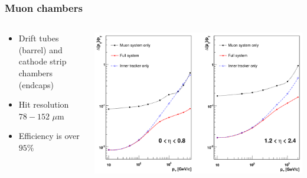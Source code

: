 \documentclass[aspectratio=169,xcolor=dvipsnames,,table,compress]{beamer}
\begin{document}
\begin{frame} \frametitle{Muon chambers}
  \begin{columns}
    \begin{column}{0.6\textwidth}
      \begin{itemize}
        \item Drift tubes (barrel) and cathode strip chambers (endcaps)
        \item Hit resolution $78-152$ $\mu$m
        \item Efficiency is over $95\%$ 
      \end{itemize}        
    \end{column}
    \begin{column}{0.4\textwidth}
      \includegraphics[width=\textwidth]{../figures/cms/muonpt.png}
    \end{column}
  \end{columns}
\end{frame}
\end{document}

